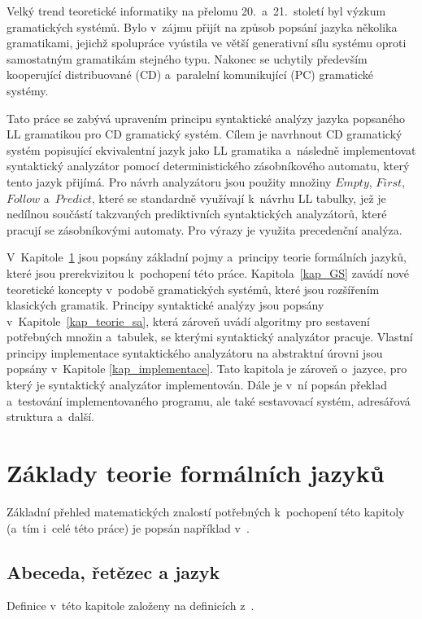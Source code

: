 Velký trend teoretické informatiky na přelomu 20.~a~21.~století byl výzkum gramatických systémů.
Bylo v~zájmu přijít na způsob popsání jazyka několika gramatikami, jejichž spolupráce vyústila ve větší generativní sílu systému oproti samostatným gramatikám stejného typu.
Nakonec se uchytily především kooperující distribuované (CD) a~paralelní komunikující (PC) gramatické systémy.

Tato práce se zabývá upravením principu syntaktické analýzy jazyka popsaného LL gramatikou pro CD gramatický systém.
Cílem je navrhnout CD gramatický systém popisující ekvivalentní jazyk jako LL gramatika a~následně implementovat syntaktický analyzátor pomocí deterministického zásobníkového automatu, který tento jazyk přijímá.
Pro návrh analyzátoru jsou použity množiny $Empty$, $First$, $Follow$ a~$Predict$, které se standardně využívají k~návrhu LL tabulky, jež je nedílnou součástí takzvaných prediktivních syntaktických analyzátorů, které pracují se zásobníkovými automaty.
Pro výrazy je využita precedenční analýza.  

V~Kapitole~\ref{kap_teorie} jsou popsány základní pojmy a~principy teorie formálních jazyků, které jsou prerekvizitou k~pochopení této práce.
Kapitola~\ref{kap_GS} zavádí nové teoretické koncepty v~podobě gramatických systémů, které jsou rozšířením klasických gramatik.
Principy syntaktické analýzy jsou popsány v~Kapitole~\ref{kap_teorie_sa}, která zároveň uvádí algoritmy pro sestavení potřebných množin a~tabulek, se kterými syntaktický analyzátor pracuje.
Vlastní principy implementace syntaktického analyzátoru na abstraktní úrovni jsou popsány v~Kapitole \ref{kap_implementace}.
Tato kapitola je zároveň o~jazyce, pro který je syntaktický analyzátor implementován.
Dále je v~ní popsán překlad a~testování implementovaného programu, ale také sestavovací systém, adresářová struktura a~další.

\cleardoublepage

\chapter{Základy teorie formálních jazyků}\label{kap_teorie}
Základní přehled matematických znalostí potřebných k~pochopení této kapitoly (a~tím i~celé této práce) je popsán například v~\cite{meduna2023automata, medunaElementsOfCompDesign,handbook1-zaklady}.

\section{Abeceda, řetězec a jazyk}\label{kap_abec_ret_jazyk}
Definice v~této kapitole založeny na definicích z~\cite{hopcroft2006introduction, handbook1-zaklady, TIN-opora}.

